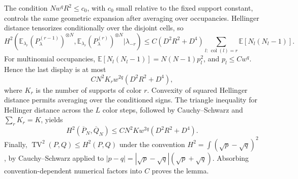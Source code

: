 The condition \(Nw^qR^2\le c_0\), with \(c_0\) small relative to the fixed support constant, controls the same geometric expansion after averaging over occupancies. Hellinger distance tensorizes conditionally over the disjoint cells, so
\[
 H^2\!\left(\mathbb E_{\lambda_r}(P_{\lambda}^{(r-1)})^{\otimes N},
 \mathbb E_{\lambda_r}(P_{\lambda}^{(r)})^{\otimes N}
 \mathrel{\big|}\lambda_{-r}\right)
 \le C(D^2R^2+D^4)\sum_{l:\,\operatorname{col}(l)=r}
 \mathbb E[N_l(N_l-1)].
\]
For multinomial occupancies, \(\mathbb E[N_l(N_l-1)]=N(N-1)p_l^2\), and \(p_l\le Cw^q\). Hence the last display is at most
\[
 C N^2K_r w^{2q}(D^2R^2+D^4),
\]
where \(K_r\) is the number of supports of color \(r\). Convexity of squared Hellinger distance permits averaging over the conditioned signs. The triangle inequality for Hellinger distance across the \(L\) color steps, followed by Cauchy--Schwarz and \(\sum_rK_r=K\), yields
\[
 H^2(\overline P_N,\overline Q_N)
 \le C N^2K w^{2q}(D^2R^2+D^4).
\]
Finally, \(\operatorname{TV}^2(P,Q)\le H^2(P,Q)\) under the convention \(H^2=\int(\sqrt p-\sqrt q)^2\), by Cauchy--Schwarz applied to \(|p-q|=|\sqrt p-\sqrt q|(\sqrt p+\sqrt q)\). Absorbing convention-dependent numerical factors into \(C\) proves the lemma.